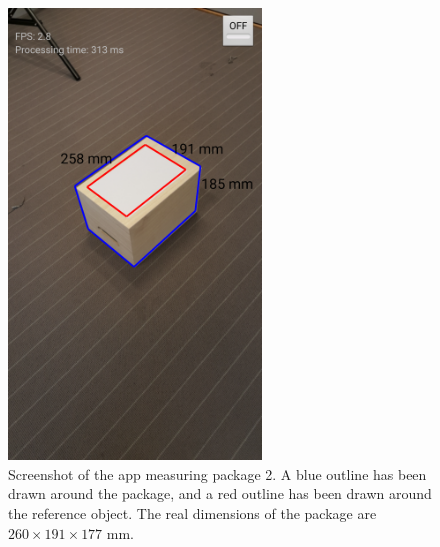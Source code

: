 \begin{figure}[H]
\begin{center}
\includegraphics[width=0.6\textwidth]{figures/screenshot.png}
\end{center}
\caption{Screenshot of the app measuring package 2. A blue outline has been drawn around the package, and a red outline has been drawn around the reference object. The real dimensions of the package are $260 \times 191 \times 177$ mm.}
\label{fig:screenshot}
\end{figure}
